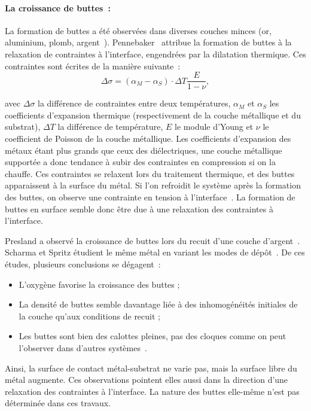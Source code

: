\paragraph*{La croissance de buttes~:} La formation de buttes a été observées dans diverses couches minces
(or, aluminium, plomb, argent~\cite{pennebaker1969hillock, dheurle1968structure, caswell1963low}). Pennebaker~\cite{pennebaker1969hillock} attribue la formation de buttes à la
relaxation de contraintes à l'interface, engendrées par la dilatation thermique. Ces contraintes sont écrites de la manière suivante~:
\begin{equation}
\Delta\sigma = (\alpha_M - \alpha_S)\cdot\Delta T\dfrac{E}{1-\nu},
\end{equation}

avec $\Delta\sigma$ la différence de contraintes entre deux températures, $\alpha_M$ et $\alpha_S$ les coefficients d'expansion thermique (respectivement de la couche métallique et du substrat), $\Delta T$ la différence de température, $E$ le module d'Young et $\nu$ le coefficient de Poisson de la couche métallique. Les coefficients d'expansion des métaux étant plus grands que ceux des diélectriques, une couche métallique supportée a donc tendance à subir des contraintes en compression si on la chauffe. Ces contraintes se relaxent lors du traitement thermique, et des buttes apparaissent à la surface du métal. Si l'on refroidit le système après la formation des buttes, on observe une contrainte en tension à l'interface~\cite{pennebaker1969hillock}. La formation de buttes en surface semble donc être due à une relaxation des contraintes à l'interface.\par 
Presland a observé la croissance de buttes lors du recuit d'une couche d'argent~\cite{presland1972hillock}. Scharma et Spritz étudient le même métal en variant les modes de dépôt~\cite{sharma1980agglomeration, sharma1980hillock, sharma1986hillock}. De ces études, plusieurs conclusions se dégagent~:
\begin{itemize}
\item L'oxygène favorise la croissance des buttes ;
\item La densité de buttes semble davantage liée à des inhomogénéités initiales de la couche qu'aux conditions de recuit ;
\item Les buttes sont bien des calottes pleines, pas des cloques comme on peut l'observer dans d'autres systèmes~\cite{gadkari2005comparison}.
\end{itemize}
Ainsi, la surface de contact métal-substrat ne varie pas, mais la surface libre du métal augmente. Ces observations pointent elles aussi dans la direction d'une relaxation des contraintes à l'interface. La nature des buttes elle-même n'est pas déterminée dans ces travaux.\par 

